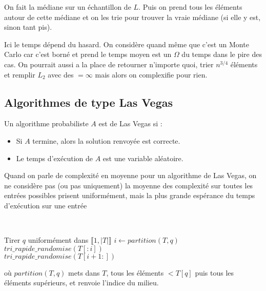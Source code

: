 \begin{idee}
	On fait la médiane sur un échantillon de $L$. Puis on prend tous les éléments autour de cette médiane et on les trie pour trouver la vraie médiane (si elle y est, sinon tant pis).
\end{idee}

\begin{com}
	Ici le temps dépend du hasard. On considère quand même que c'est un Monte Carlo car c'est borné et prend le temps moyen est un $\Omega$ du temps dans le pire des cas. On pourrait aussi a la place de retourner n'importe quoi, trier $n^{3/4}$ éléments et remplir $L_2$ avec des $= \infty$ mais alors on complexifie pour rien.
\end{com}

\subsection{Algorithmes de type Las Vegas}

\begin{definition} 
	Un algorithme probabiliste $A$ est de Las Vegas si :
	\begin{itemize}
		\item Si $A$ termine, alors la solution renvoyée est correcte.
		\item Le temps d'exécution de $A$ est une variable aléatoire.
	\end{itemize}
\end{definition}

\begin{rem}
	Quand on parle de complexité en moyenne pour un algorithme de Las Vegas, on ne considère pas (ou pas uniquement) la moyenne des complexité sur toutes les entrées possibles prisent uniformément, mais la plus grande espérance du temps d'exécution sur une entrée
\end{rem}


\begin{algo}
	\normalfont \enspace\\
	\label{11-tri-rapide}
	\begin{algorithm}[H]
		\caption{$tri\_rapide\_randomise(T)$}
		Tirer $q$ uniformément dans $\llbracket 1, |T| \rrbracket$ 
		$i \gets partition(T, q)$\\
		$tri\_rapide\_randomise(T[:i])$\\
		$tri\_rapide\_randomise(T[i+1:])$\\
	\end{algorithm}
	où $partition(T, q)$ mets dans $T$, tous les éléments $< T[q]$ puis tous les éléments supérieurs, et renvoie l'indice du milieu.
\end{algo}

